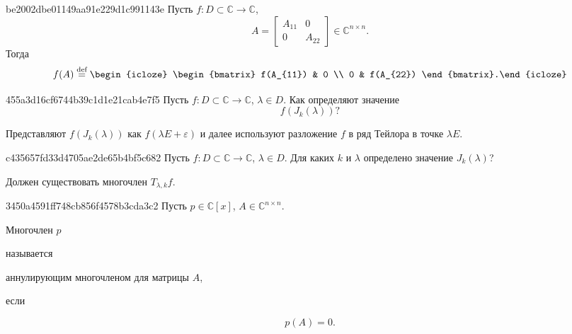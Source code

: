 \begin{note}{be2002dbe01149aa91e229d1c991143e}
    Пусть \({ f : D \subset \mathbb C \to \mathbb C }\),
    \[
        A = \begin{bmatrix}
            A_{11} & 0 \\
            0 & A_{22}
        \end{bmatrix}
        \in \mathbb C^{n \times n}.
    \]
    Тогда
    \[
        f(A) \overset{\text{def}}= \begin{icloze}{1}\begin{bmatrix}
            f(A_{11}) & 0 \\
            0 & f(A_{22})
        \end{bmatrix}.\end{icloze}
    \]
\end{note}

\begin{note}{455a3d16cf6744b39c1d1e21cab4e7f5}
    Пусть \({ f : D \subset \mathbb C \to \mathbb C }\), \({ \lambda \in D }\).
    Как определяют значение
    \[
        f(J_k(\lambda))?
    \]

    \begin{cloze}{1}
        Представляют \({ f(J_k(\lambda)) }\) как \({ f(\lambda E + \varepsilon) }\) и далее используют разложение \({ f }\) в ряд Тейлора в точке \({ \lambda E }\).
    \end{cloze}
\end{note}

\begin{note}{c435657fd33d4705ae2de65b4bf5c682}
    Пусть \({ f : D \subset \mathbb C \to \mathbb C }\), \({ \lambda \in D }\).
    Для каких \({ k }\) и \({ \lambda }\) определено значение \({ J_k (\lambda) }\)?

    \begin{cloze}{1}
        Должен существовать многочлен \({ T_{\lambda, k} f }\).
   \end{cloze}
\end{note}

\begin{note}{3450a4591ff748cb856f4578b3cda3c2}
    Пусть \({ p \in \mathbb C[x] }\),\: \({ A \in \mathbb C^{n \times n} }\). \begin{icloze}{1}Многочлен \( p \)\end{icloze} называется \begin{icloze}{2}аннулирующим многочленом для матрицы \( A \),\end{icloze} если
    \begin{icloze}{1}
        \[
            p(A) = 0.
        \]
    \end{icloze}
\end{note}

